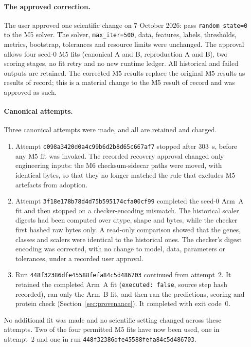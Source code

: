 \documentclass[11pt]{article}
\newcommand{\runid}{\nolinkurl{448f32386dfe45588fefa84c5d486703}}
\newcommand{\code}[1]{\texttt{#1}}
\begin{document}
\paragraph{The approved correction.} The user approved one scientific change on 7 October 2026: pass \code{random\_state=0} to the M5 solver. The solver, \code{max\_iter=500}, data, features, labels, thresholds, metrics, bootstrap, tolerances and resource limits were unchanged. The approval allows four seed-0 M5 fits (canonical A and B, reproduction A and B), two scoring stages, no fit retry and no new runtime ledger. All historical and failed outputs are retained. The corrected M5 results replace the original M5 results as results of record; this is a material change to the M5 result of record and was approved as such.

\paragraph{Canonical attempts.} Three canonical attempts were made, and all are retained and charged.
\begin{enumerate}
\item Attempt \nolinkurl{c098a3420d0a4c99b6d2b8d65c667af7} stopped after 303~s, before any M5 fit was invoked. The recorded recovery approval changed only engineering inputs: the M6 checksum-sidecar paths were moved, with identical bytes, so that they no longer matched the rule that excludes M5 artefacts from adoption.
\item Attempt \nolinkurl{3f18e178b78d4d75b595174cfa00cf99} completed the seed-0 Arm~A fit and then stopped on a checker-encoding mismatch. The historical scaler digests had been computed over dtype, shape and bytes, while the checker first hashed raw bytes only. A read-only comparison showed that the genes, classes and scalers were identical to the historical ones. The checker's digest encoding was corrected, with no change to model, data, parameters or tolerances, under a recorded user approval.
\item Run \runid{} continued from attempt~2. It retained the completed Arm~A fit (\verb|executed: false|, source step hash recorded), ran only the Arm~B fit, and then ran the predictions, scoring and protein check (Section~\ref{sec:provenance}). It completed with exit code~0.
\end{enumerate}
No additional fit was made and no scientific setting changed across these attempts. Two of the four permitted M5 fits have now been used, one in attempt~2 and one in run \runid.
\end{document}

